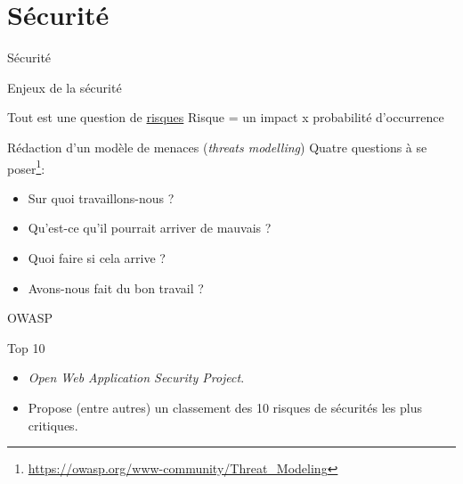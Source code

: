 \section{Sécurité}

\begin{frame}{Sécurité}  
\end{frame}

\begin{frame}{Enjeux de la sécurité}

  \begin{block}{Tout est une question de \underline{risques}}
    Risque = un impact x probabilité d'occurrence
  \end{block}

  \begin{block}{Rédaction d'un modèle de menaces (\textit{threats modelling})}
    Quatre questions à se poser\footnote{\url{https://owasp.org/www-community/Threat_Modeling}}:
    \begin{itemize}
    \item Sur quoi travaillons-nous ?
    \item Qu'est-ce qu'il pourrait arriver de mauvais ?
    \item Quoi faire si cela arrive ?
    \item Avons-nous fait du bon travail ?
    \end{itemize}
  \end{block}
\end{frame}

\begin{frame}{OWASP}
  \begin{block}{Top 10}
    \begin{itemize}
    \item \textit{Open Web Application Security Project}.
    \item Propose (entre autres) un classement des 10 risques de
      sécurités les plus critiques.
    \end{itemize}
  \end{block}
\end{frame}

